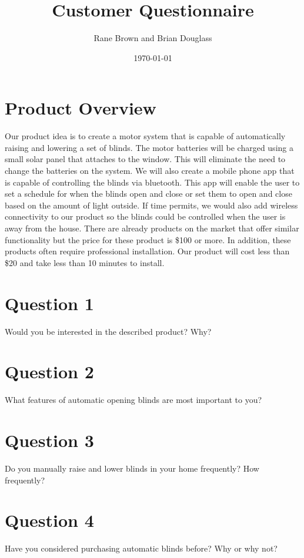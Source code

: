 \documentclass[11pt]{article}
\title{Customer Questionnaire}
\author{Rane Brown and Brian Douglass}
\date{\today}
\begin{document}
	\maketitle

	\section*{Product Overview}
		Our product idea is to create a motor system that is capable of automatically raising and lowering a set of blinds. The motor batteries will be charged using a small solar panel that attaches to the window. This will eliminate the need to change the batteries on the system. We will also create a mobile phone app that is capable of controlling the blinds via bluetooth. This app will enable the user to set a schedule for when the blinds open and close or set them to open and close based on the amount of light outside. If time permits, we would also add wireless connectivity to our product so the blinds could be controlled when the user is away from the house. There are already products on the market that offer similar functionality but the price for these product is \$100 or more. In addition, these products often require professional installation. Our product will cost less than \$20 and take less than 10 minutes to install. 

	\section*{Question 1}
		Would you be interested in the described product? Why?
		\vspace{.8 in}

	\section*{Question 2} 
		What features of automatic opening blinds are most important to you?
		\newpage

	\section*{Question 3}
		Do you manually raise and lower blinds in your home frequently? How frequently?
		\vspace{.8 in}

	\section*{Question 4}
		Have you considered purchasing automatic blinds before? Why or why not?
		\vspace{.8 in}
\end{document}
